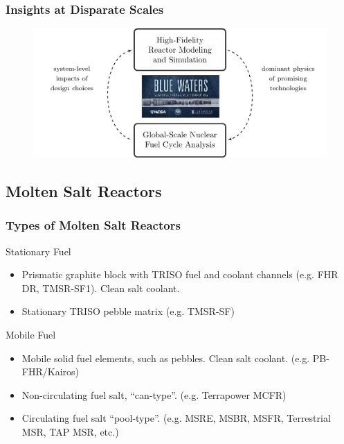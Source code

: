 \begin{frame}
  \frametitle{Insights at Disparate Scales}
               \begin{figure}[t]
                \vspace*{-0.1in}
			\hspace*{-0.35in}
                \includegraphics[height=0.5\textwidth]{./images/synergy.png}
               \end{figure}            
\end{frame}

\subsection{Molten Salt Reactors}

\begin{frame}
        \frametitle{Types of Molten Salt Reactors}
        \begin{block}{Stationary Fuel}
                \begin{itemize}
                        \item Prismatic graphite block with TRISO fuel and 
                                coolant channels (e.g. FHR DR, TMSR-SF1). Clean salt 
                                coolant.
                        \item Stationary TRISO pebble matrix (e.g. TMSR-SF)
                \end{itemize}

        \end{block}
        \begin{block}{Mobile Fuel}
                \begin{itemize}
                        \item Mobile solid fuel elements, such as pebbles. 
                                Clean salt coolant. (e.g. PB-FHR/Kairos)
                        \item Non-circulating fuel salt, ``can-type''. (e.g. Terrapower MCFR)
                        \item Circulating fuel salt ``pool-type''. (e.g. MSRE, MSBR, MSFR, 
                                Terrestrial MSR, TAP MSR, etc.)
                \end{itemize}
        \end{block}
\end{frame}


